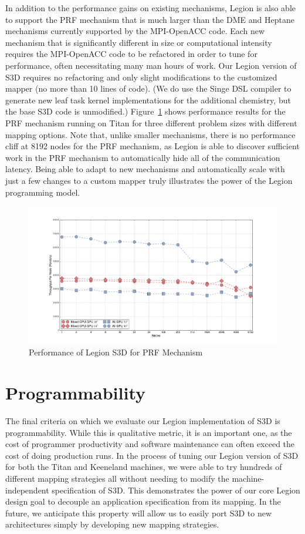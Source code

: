 In addition to the performance gains on existing mechanisms,
Legion is also able to support the PRF mechanism that is much 
larger than the DME and Heptane mechanisms currently supported 
by the MPI-OpenACC code. Each new mechanism that is significantly 
different in size or computational intensity requires the 
MPI-OpenACC code to be refactored in order to tune for performance, 
often necessitating many man hours of work. Our Legion version of
S3D requires no refactoring and only slight modifications
to the customized mapper (no more than 10 lines of code). (We
do use the Singe DSL compiler to generate new leaf task kernel 
implementations for the additional chemistry, but the base 
S3D code is unmodified.) Figure~\ref{fig:prfperf} shows performance results
for the PRF mechanism running on Titan for three different
problem sizes with different mapping options. Note that, unlike
smaller mechanisms, there is no performance cliff at 8192 nodes
for the PRF mechanism, as Legion is able to discover sufficient 
work in the PRF mechanism to automatically hide all of the 
communication latency. Being able to adapt to new mechanisms and 
automatically scale with just a few changes to a custom mapper 
truly illustrates the power of the Legion programming model.

\begin{figure}
\centering
\includegraphics[scale=0.4]{figs/legion_prf_titan.pdf}
\caption{Performance of Legion S3D for PRF Mechanism\label{fig:prfperf}}
\end{figure}

\section{Programmability}
\label{sec:s3dprogram}

The final criteria on which we evaluate our Legion implementation
of S3D is programmability. While this is qualitative metric, it 
is an important one, as the cost of programmer productivity and
software maintenance can often exceed the cost of doing production
runs. In the process of tuning our Legion version of S3D for both
the Titan and Keeneland machines, we were able to try hundreds of
different mapping strategies all without needing to modify the 
machine-independent specification of S3D. This demonstrates the
power of our core Legion design goal to decouple an application 
specification from its mapping. In the future, we anticipate this
property will allow us to easily port S3D to new architectures
simply by developing new mapping strategies.

